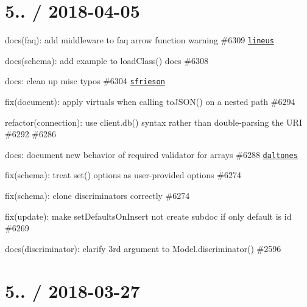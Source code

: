 \section*{5.. / 2018-\/04-\/05 }


\begin{DoxyItemize}
\item docs(faq)\+: add middleware to faq arrow function warning \#6309 \href{https://github.com/lineus}{\tt lineus}
\item docs(schema)\+: add example to load\+Class() docs \#6308
\item docs\+: clean up misc typos \#6304 \href{https://github.com/sfrieson}{\tt sfrieson}
\item fix(document)\+: apply virtuals when calling {\ttfamily to\+J\+S\+O\+N()} on a nested path \#6294
\item refactor(connection)\+: use {\ttfamily client.\+db()} syntax rather than double-\/parsing the U\+RI \#6292 \#6286
\item docs\+: document new behavior of required validator for arrays \#6288 \href{https://github.com/daltones}{\tt daltones}
\item fix(schema)\+: treat set() options as user-\/provided options \#6274
\item fix(schema)\+: clone discriminators correctly \#6274
\item fix(update)\+: make set\+Defaults\+On\+Insert not create subdoc if only default is id \#6269
\item docs(discriminator)\+: clarify 3rd argument to Model.\+discriminator() \#2596
\end{DoxyItemize}

\section*{5.. / 2018-\/03-\/27 }


